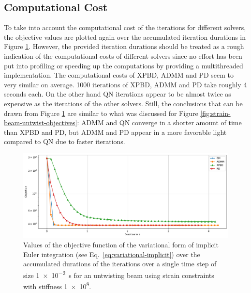\subsection{Computational Cost}\label{ss:computational-cost-strain}
To take into account the computational cost of the iterations for different solvers, the objective values are plotted again over the accumulated
iteration durations in Figure \ref{fig:strain-beam-untwist-objectives-time}. However, the provided iteration durations should be treated as a rough indication of the 
computational costs of different solvers since no effort has been put into profiling or speeding up the computations by providing a multithreaded 
implementation. The computational costs of XPBD, ADMM and PD seem to very similar on average. 1000 iterations of XPBD, ADMM and PD take roughly 4 seconds each. On the other hand 
QN iterations appear to be almost twice as expensive as the iterations of the other solvers. Still, the conclusions that can be drawn from Figure 
\ref{fig:strain-beam-untwist-objectives-time} are similar to what was discussed for Figure \ref{fig:strain-beam-untwist-objectives}: ADMM and QN converge in a shorter amount 
of time than XPBD and PD, but ADMM and PD appear in a more favorable light compared to QN due to faster iterations.

\begin{figure}[h]
    \includegraphics[width=\textwidth]{figures/strain_beam_untwist_objectives_time.pdf}
    \caption{Values of the objective function of the variational form of implicit Euler integration (see Eq.\ \ref{eq:variational-implicit}) over the accumulated durations of 
        the iterations over a single time step of size \SI{1e-2}{\second} for an untwisting beam using strain constraints with stiffness \num{1e8}.}
    \label{fig:strain-beam-untwist-objectives-time}
\end{figure}

